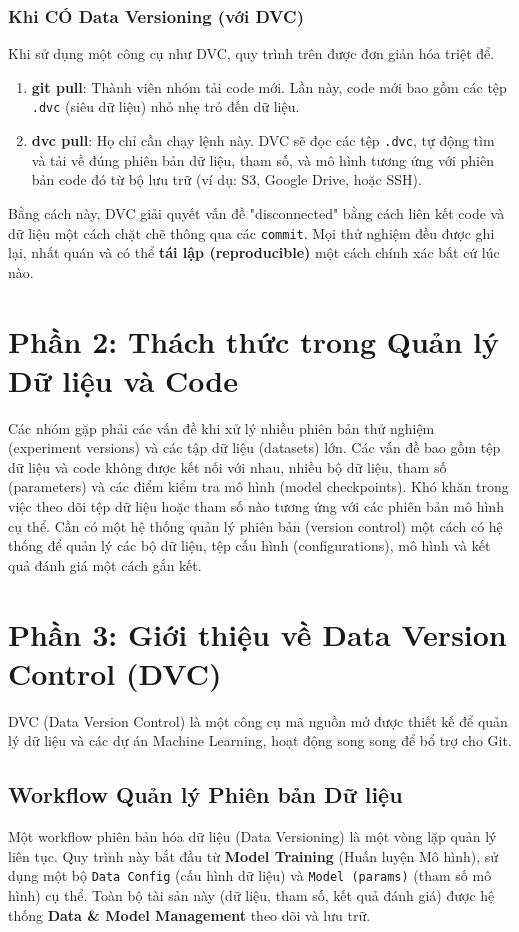 \documentclass[11pt]{article}
\begin{document}
\subsubsection{Khi CÓ Data Versioning (với DVC)}
Khi sử dụng một công cụ như DVC, quy trình trên được đơn giản hóa triệt để.
\begin{enumerate}
    \item \textbf{git pull}: Thành viên nhóm tải code mới. Lần này, code mới bao gồm các tệp \texttt{.dvc} (siêu dữ liệu) nhỏ nhẹ trỏ đến dữ liệu.
    \item \textbf{dvc pull}: Họ chỉ cần chạy lệnh này. DVC sẽ đọc các tệp \texttt{.dvc}, tự động tìm và tải về đúng phiên bản dữ liệu, tham số, và mô hình tương ứng với phiên bản code đó từ bộ lưu trữ (ví dụ: S3, Google Drive, hoặc SSH).
\end{enumerate}
Bằng cách này, DVC giải quyết vấn đề "disconnected" bằng cách liên kết code và dữ liệu một cách chặt chẽ thông qua các \texttt{commit}. Mọi thử nghiệm đều được ghi lại, nhất quán và có thể \textbf{tái lập (reproducible)} một cách chính xác bất cứ lúc nào.

\section{Phần 2: Thách thức trong Quản lý Dữ liệu và Code}
Các nhóm gặp phải các vấn đề khi xử lý nhiều phiên bản thử nghiệm (experiment versions) và các tập dữ liệu (datasets) lớn. Các vấn đề bao gồm tệp dữ liệu và code không được kết nối với nhau, nhiều bộ dữ liệu, tham số (parameters) và các điểm kiểm tra mô hình (model checkpoints). Khó khăn trong việc theo dõi tệp dữ liệu hoặc tham số nào tương ứng với các phiên bản mô hình cụ thể. Cần có một hệ thống quản lý phiên bản (version control) một cách có hệ thống để quản lý các bộ dữ liệu, tệp cấu hình (configurations), mô hình và kết quả đánh giá một cách gắn kết.

\section{Phần 3: Giới thiệu về Data Version Control (DVC)}
DVC (Data Version Control) là một công cụ mã nguồn mở được thiết kế để quản lý dữ liệu và các dự án Machine Learning, hoạt động song song để bổ trợ cho Git.

\subsection{Workflow Quản lý Phiên bản Dữ liệu}
Một workflow phiên bản hóa dữ liệu (Data Versioning) là một vòng lặp quản lý liên tục. Quy trình này bắt đầu từ \textbf{Model Training} (Huấn luyện Mô hình), sử dụng một bộ \texttt{Data Config} (cấu hình dữ liệu) và \texttt{Model (params)} (tham số mô hình) cụ thể. Toàn bộ tài sản này (dữ liệu, tham số, kết quả đánh giá) được hệ thống \textbf{Data \& Model Management} theo dõi và lưu trữ.
\end{document}
